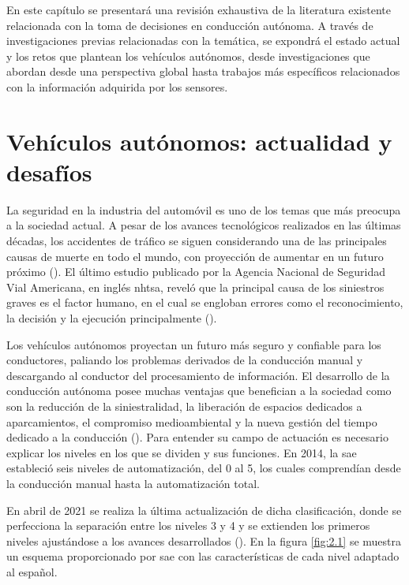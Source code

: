 En este capítulo se presentará una revisión exhaustiva de la literatura existente relacionada con la toma de decisiones en conducción autónoma. A través de investigaciones previas relacionadas con la temática, se expondrá el estado actual y los retos que plantean los vehículos autónomos, desde investigaciones que abordan desde una perspectiva global hasta trabajos más específicos relacionados con la información adquirida por los sensores.

\section{Vehículos autónomos: actualidad y desafíos}

La seguridad en la industria del automóvil es uno de los temas que más preocupa a la sociedad actual. A pesar de los avances tecnológicos realizados en las últimas décadas, los accidentes de tráfico se siguen considerando una de las principales causas de muerte en todo el mundo, con proyección de aumentar en un futuro próximo (\cite{who2018}). El último estudio publicado por la Agencia Nacional de Seguridad Vial Americana, en inglés \gls{nhtsa}, reveló que la principal causa de los siniestros graves es el factor humano, en el cual se engloban errores como el reconocimiento, la decisión y la ejecución principalmente (\cite{nhtsa18}). 

Los vehículos autónomos proyectan un futuro más seguro y confiable para los conductores, paliando los problemas derivados de la conducción manual y descargando al conductor del procesamiento de información. El desarrollo de la conducción autónoma posee muchas ventajas que benefician a la sociedad como son la reducción de la siniestralidad, la liberación de espacios dedicados a aparcamientos, el compromiso medioambiental y la nueva gestión del tiempo dedicado a la conducción (\cite{terrones}). Para entender su campo de actuación es necesario explicar los niveles en los que se dividen y sus funciones. En 2014, la \gls{sae} estableció seis niveles de automatización, del 0 al 5, los cuales comprendían desde la conducción manual hasta la automatización total. 

En abril de 2021 se realiza la última actualización de dicha clasificación, donde se perfecciona la separación entre los niveles 3 y 4 y se extienden los primeros niveles ajustándose a los avances desarrollados (\cite{sae}). En la figura \ref{fig:2.1} se muestra un esquema proporcionado por \gls{sae} con las características de cada nivel adaptado al español.

